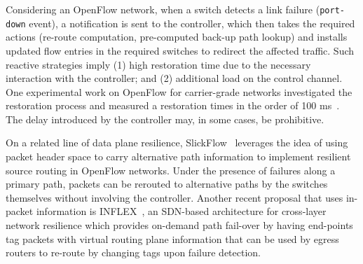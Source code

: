 Considering an OpenFlow network, when a switch detects a link failure (\texttt{port-down} event), a notification is sent to the controller, which then takes the required actions (re-route computation, pre-computed back-up path lookup) and installs updated flow entries in the required switches to redirect the affected traffic. Such reactive strategies imply (1) high restoration time due to the necessary interaction with the controller; and (2) additional
load on the control channel. 
One experimental work on OpenFlow for carrier-grade networks investigated the restoration process and measured a restoration times in the order of 100 ms~\cite{sharma2013-1}. The delay introduced by the controller may, in some cases, be prohibitive. 


On a related line of data plane resilience, SlickFlow~\cite{ramos2013} leverages the idea of using packet header space to carry alternative path information to implement resilient source routing in OpenFlow networks. Under the presence of failures along a primary path, packets can be rerouted to alternative paths by the switches themselves without involving the controller.  
Another recent proposal that uses in-packet information is INFLEX~\cite{araujosoftware}, an SDN-based architecture
for cross-layer network resilience which provides on-demand path fail-over by having end-points tag packets with virtual routing plane information that can be used by egress routers to re-route by changing tags upon failure detection.

